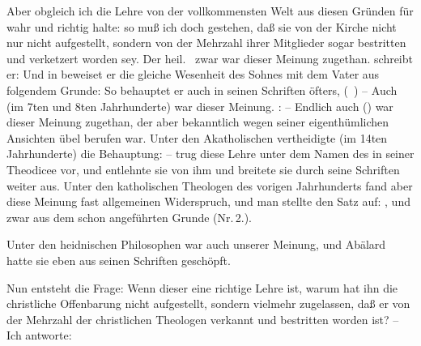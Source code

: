 \begin{aufza}
\item Aber obgleich ich die Lehre von der vollkommensten Welt aus diesen Gründen für wahr und richtig halte: so muß ich doch gestehen, daß sie von der Kirche nicht nur nicht aufgestellt, sondern von der Mehrzahl ihrer Mitglieder sogar bestritten und verketzert worden sey. Der heil.\  zwar war dieser Meinung zugethan.  schreibt er:  Und in  beweiset er die gleiche Wesenheit des Sohnes mit dem Vater aus folgendem Grunde:  So behauptet er auch in seinen Schriften öfters,  (\zB\ ) -- Auch  (im 7ten und 8ten Jahrhunderte) war dieser Meinung. :  -- Endlich auch () war dieser Meinung zugethan, der aber bekanntlich wegen seiner eigenthümlichen Ansichten übel berufen war. Unter den Akatholischen vertheidigte  (im 14ten Jahrhunderte) die Behauptung:  --  trug diese Lehre unter dem Namen des  in seiner Theodicee vor, und  entlehnte sie von ihm und breitete sie durch seine Schriften weiter aus. Unter den katholischen Theologen des vorigen Jahrhunderts fand aber diese Meinung fast allgemeinen Widerspruch, und man stellte den Satz auf: , und zwar aus dem schon angeführten Grunde (Nr.\,2.).~
\begin{RWanm}
Unter den heidnischen Philosophen war auch  unserer Meinung, und Abälard hatte sie eben aus seinen Schriften geschöpft.
\end{RWanm}
\item Nun entsteht die Frage: Wenn dieser  eine richtige Lehre ist, warum hat ihn die christliche Offenbarung nicht aufgestellt, sondern vielmehr zugelassen, daß er von der Mehrzahl der christlichen Theologen verkannt und bestritten worden ist? -- Ich antworte:

\end{aufza}
